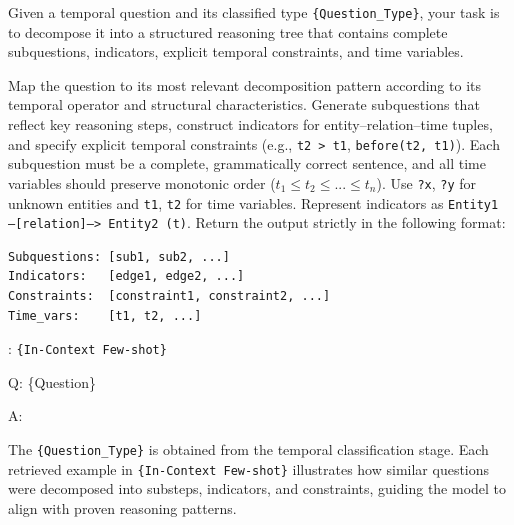 \begin{center}
\begin{minipage}{0.9\columnwidth}
    \centering
    \vspace{2mm}
    \begin{tcolorbox}[title=Question Tree Construction Prompt Template]
        \small
Given a temporal question and its classified type \texttt{\{Question\_Type\}}, your task is to decompose it into a structured reasoning tree that contains complete subquestions, indicators, explicit temporal constraints, and time variables.  

Map the question to its most relevant decomposition pattern according to its temporal operator and structural characteristics.  
Generate subquestions that reflect key reasoning steps, construct indicators for entity–relation–time tuples,  
and specify explicit temporal constraints (e.g., \texttt{t2 > t1}, \texttt{before(t2, t1)}).  
Each subquestion must be a complete, grammatically correct sentence, and all time variables should preserve monotonic order (\(t_1 \leq t_2 \leq ... \leq t_n\)).  
Use \texttt{?x}, \texttt{?y} for unknown entities and \texttt{t1}, \texttt{t2} for time variables.  
Represent indicators as \texttt{Entity1 --[relation]--> Entity2 (t)}.  
Return the output strictly in the following format:

\begin{verbatim}
Subquestions: [sub1, sub2, ...]
Indicators:   [edge1, edge2, ...]
Constraints:  [constraint1, constraint2, ...]
Time_vars:    [t1, t2, ...]
\end{verbatim}



\vspace{5pt}
:
\texttt{\{In-Context Few-shot\}}
\vspace{5pt}

Q: \{Question\}

A:
    \end{tcolorbox}
\end{minipage}
\end{center}
\vspace{3mm}

\noindent
The \texttt{\{Question\_Type\}} is obtained from the temporal classification stage.  
Each retrieved example in \texttt{\{In-Context Few-shot\}} illustrates how similar questions were decomposed into substeps, indicators, and constraints, guiding the model to align with proven reasoning patterns.

